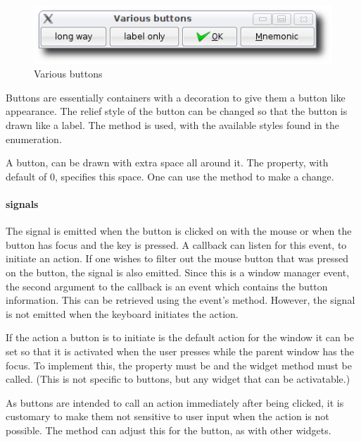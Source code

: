 \begin{figure}
  \centering
  \includegraphics[width=.8\textwidth]{RGtk2-various-button}
  \caption{Various buttons}
  \label{fig:RGtk2:various-buttons}
\end{figure}

Buttons are essentially containers with a decoration to give them a
button like appearance. The relief style of the button can be changed
so that the button is drawn like a label. The method
 is used, with the available styles
found in the  enumeration.

A button, can be drawn with extra space all around it. The
 property, with default of 0, specifies this space.
One can use the method  to make
a change.


\paragraph{signals}
The  signal is emitted when the button is
clicked on with the mouse or when the button has focus and the
 key is pressed. A callback can listen for this event, to
initiate an action.  If one wishes to filter out the mouse
button that was pressed on the button, the  signal
is also emitted. Since this is a window manager event, the second
argument to the callback is an event which contains the button
information. This can be retrieved using the event's
 method. However, the
 signal is not emitted when the keyboard initiates
the action.

If the action a button is to initiate is the default action for the
window it can be set so that it is activated
when the user presses   while the parent window has the
focus. To implement this, the property  must be
 and the widget method  must
be called. (This is not specific to buttons, but any widget that can
be activatable.)


As buttons are intended to call an action immediately after being
clicked, it is customary to make them not sensitive to user input when the action is not possible. The  method can adjust this for the button, as with other widgets.


